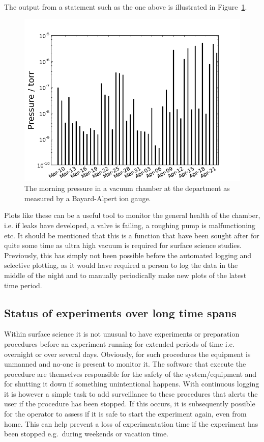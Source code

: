 The output from a statement such as the one above is illustrated in
Figure~\ref{fig:morning_pressure}.
\begin{figure}
 \begin{center} 
  \includegraphics[width=12cm]{morning_pressure.png} 

\caption{The morning pressure in a vacuum chamber at the department as measured
 by a Bayard-Alpert ion gauge.\label{fig:morning_pressure}} 
\end{center}
\end{figure} 
Plots like these can be a useful tool to monitor the general health of the
chamber, i.e. if leaks have developed, a valve is failing, a roughing pump is
malfunctioning etc. It should be mentioned that this is a function that have
been sought after for quite some time as ultra high vacuum is required for
surface science studies. Previously, this has simply not been possible before
the automated logging and selective plotting, as it would have required a
person to log the data in the middle of the night and to manually periodically
make new plots of the latest time period.

\subsection{Status of experiments over long time spans} 
Within surface science it is not unusual to have experiments or preparation
procedures before an experiment running for extended periods of time i.e.
overnight or over several days. Obviously, for such procedures the equipment is
unmanned and no-one is present to monitor it. The software that execute the
procedure are themselves responsible for the safety of the system/equipment and
for shutting it down if something unintentional happens. With continuous
logging it is however a simple task to add surveillance to these procedures that
alerts the user if the procedure has been stopped. If this occurs, it is
subsequently possible for the operator to assess if it is safe to start the
experiment again, even from home. This can help prevent a loss of
experimentation time if the experiment has been stopped e.g.\ during weekends
or vacation time.

